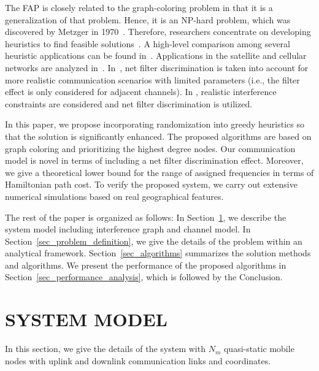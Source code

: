 \documentclass[10pt,twocolumn,twoside]{JCNtran}
\newcommand{\nummobile}{N_{m}}
\begin{document}
The FAP is closely related to the graph-coloring problem in that it is a generalization of that problem. Hence, it is an NP-hard problem, which was discovered by Metzger in 1970~\cite{metzger1970spectrumMT,hale1980frequencyAT}. Therefore, researchers concentrate on developing heuristics to find feasible solutions~\cite{montemanni2010heuristicMT,fischetti2000frequencyAI,maniezzo2000antsHF}. A high-level comparison among several heuristic applications can be found in~\cite{aardal2007modelsAS,hurley1996comparisonOL,lozano2012interferencePA,sharma2014compositeDE,koo2016heuristicsFF}. Applications in the satellite and cellular networks are analyzed in~\cite{graham2008frequencyAM,hurley2000channelAI,wang2015multiobjectiveEA,audhya2013newAT,da2013newMA,qian2015adaptiveSF}.  In~\cite{mannino2003enumerativeAF}, net filter discrimination is taken into account for more realistic communication scenarios with  limited parameters (i.e., the filter effect is only considered for adjacent channels). In \cite{koo2016heuristicsFF}, realistic interference constraints are considered and net filter discrimination is utilized.

In this paper, we propose incorporating randomization into greedy heuristics so that the solution is significantly enhanced. The proposed algorithms are based on graph coloring and prioritizing the highest degree nodes. Our communication model is novel in terms of including a net filter discrimination effect. Moreover, we give a theoretical lower bound for the range of assigned frequencies in terms of Hamiltonian path cost. To verify the proposed system, we carry out extensive numerical simulations based on real geographical features.

The rest of the paper is organized as follows: In Section~\ref{sec_system_model}, we describe the system model including interference graph and channel model. In Section~\ref{sec_problem_definition}, we give the details of the problem within an analytical framework. Section~\ref{sec_algorithms} summarizes the solution methods and algorithms. We present the performance of the proposed algorithms in Section~\ref{sec_performance_analysis}, which is followed by the Conclusion.





\section{\uppercase{System Model}}
\label{sec_system_model}
In this section, we give the details of the system with $\nummobile$ quasi-static mobile nodes with uplink and downlink communication links and coordinates. 
\end{document}
